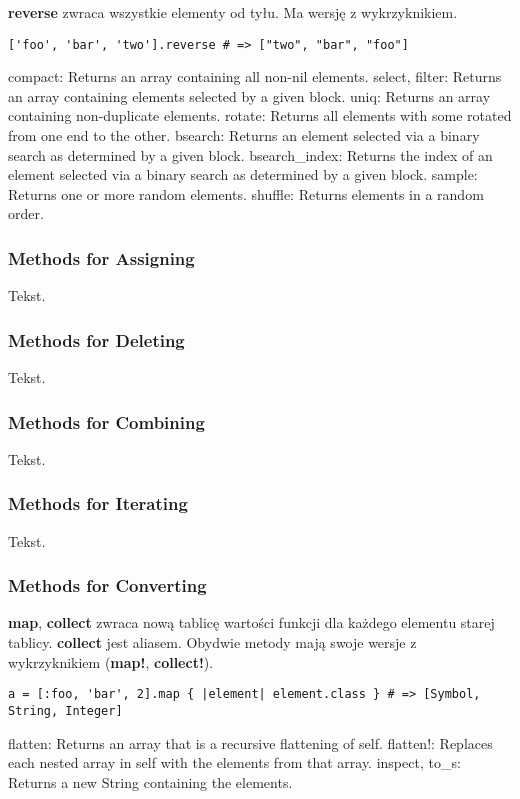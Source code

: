 \textbf{reverse} zwraca wszystkie elementy od tyłu.
Ma wersję z wykrzyknikiem.
\begin{verbatim}
['foo', 'bar', 'two'].reverse # => ["two", "bar", "foo"]
\end{verbatim}

{\footnotesize
compact: Returns an array containing all non-nil elements.
select, filter: Returns an array containing elements selected by a given block.
uniq: Returns an array containing non-duplicate elements.
rotate: Returns all elements with some rotated from one end to the other.
bsearch: Returns an element selected via a binary search as determined by a given block.
bsearch\_index: Returns the index of an element selected via a binary search as determined by a given block.
sample: Returns one or more random elements.
shuffle: Returns elements in a random order.
}

\subsubsection{Methods for Assigning}
Tekst.

\subsubsection{Methods for Deleting}
Tekst.

\subsubsection{Methods for Combining}
Tekst.

\subsubsection{Methods for Iterating}
Tekst.

\subsubsection{Methods for Converting}
\textbf{map}, \textbf{collect} zwraca nową tablicę wartości funkcji dla każdego elementu starej tablicy.
\textbf{collect} jest aliasem.
Obydwie metody mają swoje wersje z wykrzyknikiem (\textbf{map!}, \textbf{collect!}).
\begin{verbatim}
a = [:foo, 'bar', 2].map { |element| element.class } # => [Symbol, String, Integer]
\end{verbatim}

{\footnotesize
flatten: Returns an array that is a recursive flattening of self.
flatten!: Replaces each nested array in self with the elements from that array.
inspect, to\_s: Returns a new String containing the elements.
}

